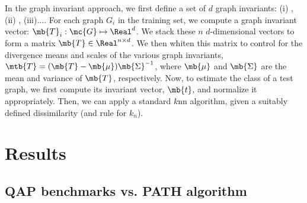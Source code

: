In the graph invariant approach, we first define a set of $d$ graph invariants: (i) , (ii) , (iii)....  For each graph $G_i$ in the training set, we compute a graph invariant vector: $\mb{T}_i: \mc{G} \mapsto \Real^d$.  We stack these $n$ $d$-dimensional vectors to form a matrix $\mb{T} \in \Real^{n \times d}$. We then whiten this matrix to control for the divergence means and scales of the various graph invariants, $\mtb{T}=(\mb{T}-\mb{\mu}) \mb{\Sigma}^{-1}$, where $\mb{\mu}$ and $\mb{\Sigma}$ are the mean and variance of $\mb{T}$, respectively.  Now, to estimate the class of a test graph, we first compute its invariant vector, $\mb{t}$, and normalize it appropriately.  Then, we can apply a standard $k$nn algorithm, given a suitably defined dissimilarity (and rule for $k_n$).





% 
% 
% 

\section{Results}

\subsection{QAP benchmarks vs. PATH algorithm}

